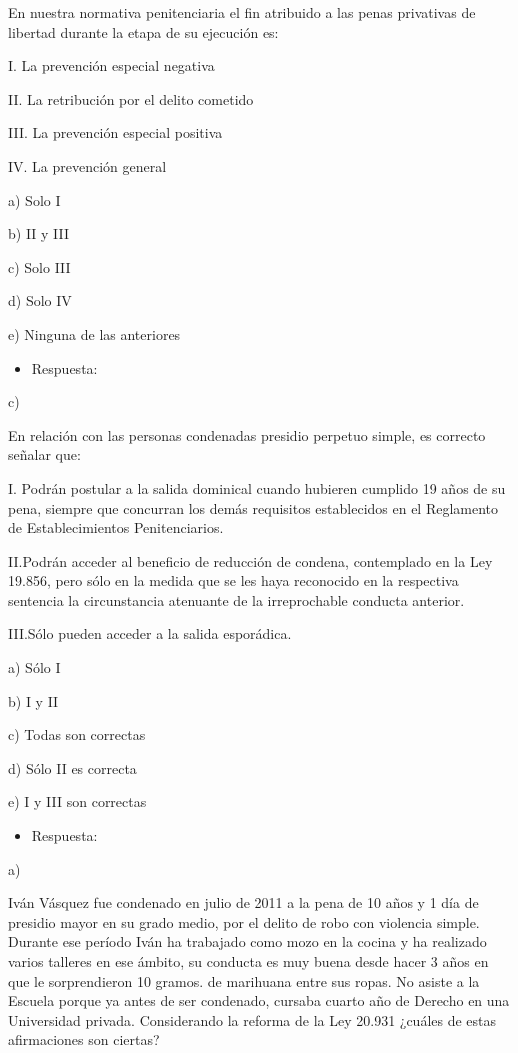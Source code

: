 \documentclass[letterpaper, 11pt]{article}
\begin{document}
En nuestra normativa penitenciaria el fin atribuido a las penas privativas de
libertad durante la etapa de su ejecución es:

I. La prevención especial negativa

II. La retribución por el delito cometido

III. La prevención especial positiva

IV. La prevención general

a) Solo I

b) II y III

c) Solo III

d) Solo IV

e) Ninguna de las anteriores

\begin{itemize}
\item Respuesta:
\end{itemize}
c)


En relación con las personas condenadas presidio perpetuo simple, es correcto
señalar que:

I. Podrán postular a la salida dominical cuando hubieren cumplido 19 años de su
pena, siempre que concurran los demás requisitos establecidos en el Reglamento
de Establecimientos Penitenciarios.

II.Podrán acceder al beneficio de reducción de condena, contemplado en la Ley
19.856, pero sólo en la medida que se les haya reconocido en la respectiva
sentencia la circunstancia atenuante de la irreprochable conducta anterior.

III.Sólo pueden acceder a la salida esporádica.

a) Sólo I

b) I y II

c) Todas son correctas

d) Sólo II es correcta

e) I y III son correctas

\begin{itemize}
\item Respuesta:
\end{itemize}
a)


Iván Vásquez fue condenado en julio de 2011 a la pena de 10 años y 1
día de presidio mayor en su grado medio, por el delito de robo con
violencia simple.  Durante ese período Iván ha trabajado como mozo en
la cocina y ha realizado varios talleres en ese ámbito, su conducta es
muy buena desde hacer 3 años en que le sorprendieron 10 gramos. de
marihuana entre sus ropas. No asiste a la Escuela porque ya antes de
ser condenado, cursaba cuarto año de Derecho en una Universidad
privada. Considerando la reforma de la Ley 20.931 ¿cuáles de estas
afirmaciones son ciertas?
\end{document}
